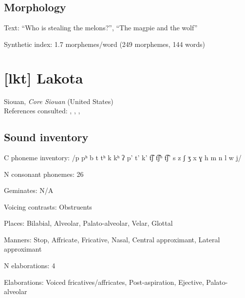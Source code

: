 {\subsection*{Morphology}

\begin{appendixdesc}

\item[Text:] “Who is stealing the melons?”, “The magpie and the wolf” \citep[448--456]{Haspelmath1993}

\item[Synthetic index:] 1.7 morphemes/word (249 morphemes, 144 words)
\end{appendixdesc}
\section*{[lkt] Lakota}  %
Siouan, \textit{Core Siouan} (United States)\medskip\\
References consulted: \citet{Ingham2003},  \citet{LakotaLanguageConsortium2008}, \citet{Mirzayan2010}, \citet{RoodTaylor1996}

\subsection*{Sound inventory}
\begin{appendixdesc}

\item[C phoneme inventory:] /p pʰ b t tʰ k kʰ ʔ p’ t’ k’ t͡ʃ t͡ʃʰ t͡ʃ’ s z ʃ ʒ x ɣ h m n l w j/

\item[N consonant phonemes:] 26

\item[Geminates:] N/A

\item[Voicing contrasts:] Obstruents

\item[Places:] Bilabial, Alveolar, Palato-alveolar, Velar, Glottal

\item[Manners:] Stop, Affricate, Fricative, Nasal, Central approximant, Lateral approximant

\item[N elaborations:] 4

\item[Elaborations:] Voiced fricatives/affricates, Post-aspiration, Ejective, Palato-alveolar


\end{appendixdesc}}
